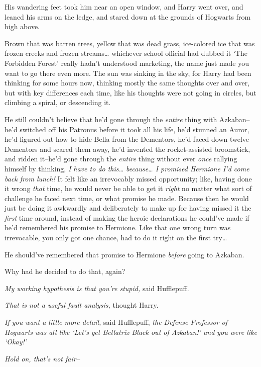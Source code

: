 His wandering feet took him near an open window, and Harry went over, and leaned his arms on the ledge, and stared down at the grounds of Hogwarts from high above.

Brown that was barren trees, yellow that was dead grass, ice-colored ice that was frozen creeks and frozen streams{\ldots} whichever school official had dubbed it `The Forbidden Forest' really hadn't understood marketing, the name just made you want to go there even more. The sun was sinking in the sky, for Harry had been thinking for some hours now, thinking mostly the same thoughts over and over, but with key differences each time, like his thoughts were not going in circles, but climbing a spiral, or descending it.

He still couldn't believe that he'd gone through the \emph{entire} thing with Azkaban\---he'd switched off his Patronus before it took all his life, he'd stunned an Auror, he'd figured out how to hide Bella from the Dementors, he'd faced down twelve Dementors and scared them away, he'd invented the rocket-assisted broomstick, and ridden it\---he'd gone through the \emph{entire} thing without ever \emph{once} rallying himself by thinking, \emph{I have to do this{\ldots} because{\ldots} I promised Hermione I'd come back from lunch!} It felt like an irrevocably missed opportunity; like, having done it wrong \emph{that} time, he would never be able to get it \emph{right} no matter what sort of challenge he faced next time, or what promise he made. Because then he would just be doing it awkwardly and deliberately to make up for having missed it the \emph{first} time around, instead of making the heroic declarations he could've made if he'd remembered his promise to Hermione. Like that one wrong turn was irrevocable, you only got one chance, had to do it right on the first try{\ldots}

He should've remembered that promise to Hermione \emph{before} going to Azkaban.

Why had he decided to do that, again?

\emph{My working hypothesis is that you're stupid,} said Hufflepuff.

\emph{That is not a useful fault analysis,} thought Harry.

\emph{If you want a little more detail,} said Hufflepuff, \emph{the Defense Professor of Hogwarts was all like `Let's get Bellatrix Black out of Azkaban!' and you were like `Okay!'}

\emph{Hold on, \emph{that's} not fair\---}

